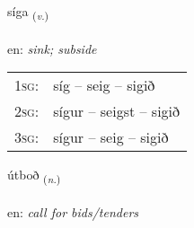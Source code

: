\documentclass[frontgrid, backgrid]{flacards}\usepackage[]{graphicx}\usepackage[]{xcolor}
\begin{document}
\renewcommand{\flhead}{\vskip5pt \fboxsep=0pt {\small\bfseries\footnotesize Sagnorð | Verb}}
\renewcommand{\fcfoot}{\vskip5pt \fboxsep=0pt \hspace{2pt}{\small\bfseries\footnotesize 3K}}

\renewcommand{\blhead}{\vskip5pt {\small\bfseries\footnotesize Sagnorð | Verb }}
\renewcommand{\bcfoot}{\vskip5pt \hspace{2pt}{\small\bfseries\footnotesize 3K}}


{síga \small{\textsubscript{(\textit{v.})}} \\[1ex] %
\textphonetic{[siːɣa]} \\
en: \emph{sink; subside} \\  [2ex]
\renewcommand*{\arraystretch}{0.8}
\begin{tabular}{p{1cm}l}
\textsc{1sg}: & síg -- seig -- sigið \\ 
\textsc{2sg}: & sígur -- seigst -- sigið \\ 
\textsc{3sg}: & sígur -- seig -- sigið \\ 
\end{tabular}
}

\renewcommand{\flhead}{\vskip5pt \fboxsep=0pt {\small\bfseries\footnotesize Nafnorð | Noun}}
\renewcommand{\fcfoot}{\vskip5pt \fboxsep=0pt \hspace{2pt}{\small\bfseries\footnotesize 3K}}

\renewcommand{\blhead}{\vskip5pt {\small\bfseries\footnotesize Nafnorð | Noun }}
\renewcommand{\bcfoot}{\vskip5pt \hspace{2pt}{\small\bfseries\footnotesize 3K}}


{útboð \small{\textsubscript{(\textit{n.})}} \\[1ex] %
\textphonetic{[uːtpɔð]} \\
en: \emph{call for bids/tenders} \\  [2ex]
\renewcommand*{\arraystretch}{0.8}
}
\end{document}
